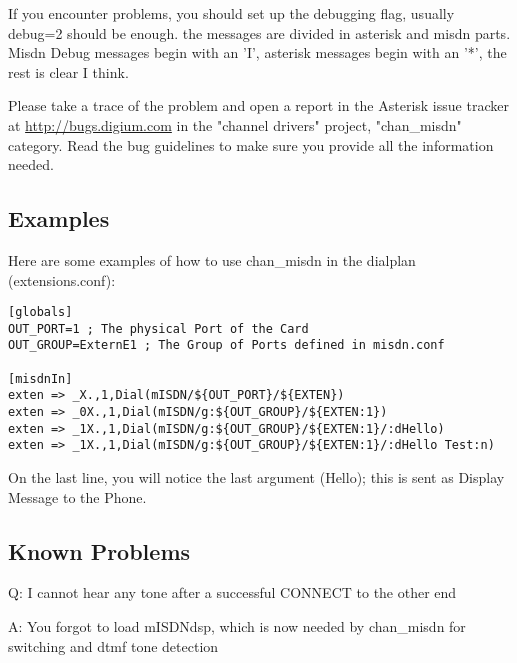 If you encounter problems, you should set up the debugging flag, usually
debug=2 should be enough. the messages are divided in asterisk and misdn
parts.  Misdn Debug messages begin with an 'I', asterisk messages begin with
an '*', the rest is clear I think.

Please take a trace of the problem and open a report in the Asterisk issue
tracker at \url{http://bugs.digium.com} in the "channel drivers" project,
"chan\_misdn" category. Read the bug guidelines to make sure you
provide all the information needed.


\subsection{Examples}

Here are some examples of how to use chan\_misdn in the dialplan
(extensions.conf):

\begin{astlisting}
\begin{verbatim}
[globals]
OUT_PORT=1 ; The physical Port of the Card
OUT_GROUP=ExternE1 ; The Group of Ports defined in misdn.conf

[misdnIn]
exten => _X.,1,Dial(mISDN/${OUT_PORT}/${EXTEN})
exten => _0X.,1,Dial(mISDN/g:${OUT_GROUP}/${EXTEN:1})
exten => _1X.,1,Dial(mISDN/g:${OUT_GROUP}/${EXTEN:1}/:dHello)
exten => _1X.,1,Dial(mISDN/g:${OUT_GROUP}/${EXTEN:1}/:dHello Test:n)
\end{verbatim}
\end{astlisting}

On the last line, you will notice the last argument (Hello); this is sent
as Display Message to the Phone.

\subsection{Known Problems}

Q: I cannot hear any tone after a successful CONNECT to the other end

A: You forgot to load mISDNdsp, which is now needed by chan\_misdn for switching
and dtmf tone detection
